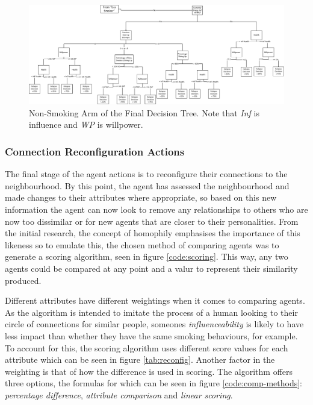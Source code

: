 \documentclass[]{report}
\begin{document}
\begin{landscape}
\begin{figure}
\begin{center}
\includegraphics[width=\paperwidth,keepaspectratio]{dectree-right.png}
\caption{Non-Smoking Arm of the Final Decision Tree. Note that \emph{Inf} is influence and \emph{WP} is willpower.}
\label{img:dectree-right}
\end{center}
\end{figure}
\end{landscape}


\subsubsection{Connection Reconfiguration Actions}

The final stage of the agent actions is to reconfigure their connections to the neighbourhood. By this point, the agent has assessed the neighbourhood and made changes to their attributes where appropriate, so based on this new information the agent can now look to remove any relationships to others who are now too dissimilar or for new agents that are closer to their personalities. From the initial research, the concept of homophily emphasises the importance of this likeness so to emulate this, the chosen method of comparing agents was to generate a scoring algorithm, seen in figure \ref{code:scoring}. This way, any two agents could be compared at any point and a valur to represent their similarity produced.

Different attributes have different weightings when it comes to comparing agents. As the algorithm is intended to imitate the process of a human looking to their circle of connections for  similar people, someones \emph{influenceability} is likely to have less impact than whether they have the same smoking behaviours, for example. To account for this, the scoring algorithm uses different score values for each attribute which can be seen in figure \ref{tab:reconfig}. Another factor in the weighting is that of how the difference is used in scoring. The algorithm offers three options, the formulas for which can be seen in figure \ref{code:comp-methods}: \emph{percentage difference}, \emph{attribute comparison} and \emph{linear scoring}.
\end{document}
